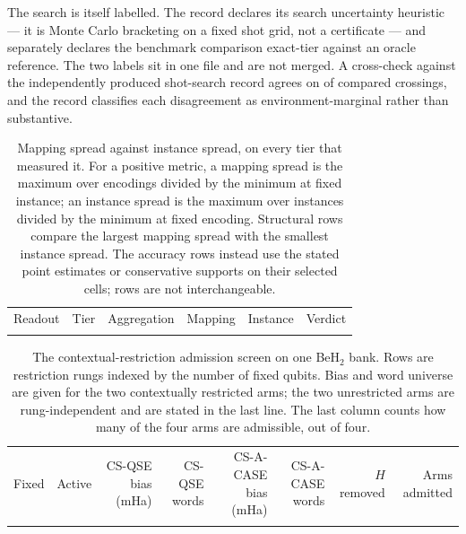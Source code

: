\documentclass[aps,pra,reprint,superscriptaddress,nofootinbib,floatfix,
  showkeys]{revtex4-2}
\begin{document}
The search is itself labelled.  The record declares its search uncertainty
heuristic --- it is Monte Carlo bracketing on a fixed shot grid, not a
certificate --- and separately declares the benchmark comparison exact-tier
against an oracle reference.  The two labels sit in one file and are not merged.
A cross-check against the independently produced shot-search record agrees on
\cqcCrossAgreeing{} of \cqcCrossChecked{} compared crossings, and the record
classifies each disagreement as environment-marginal rather than substantive.

\begin{table}
  \caption{Mapping spread against instance spread, on every tier that measured
  it. For a positive metric, a mapping spread is the maximum over encodings
  divided by the minimum at fixed instance; an instance spread is the maximum
  over instances divided by the minimum at fixed encoding. Structural rows
  compare the largest mapping spread with the smallest instance spread. The
  accuracy rows instead use the stated point estimates or conservative supports
  on their selected cells; rows are not interchangeable.}
  \label{tab:qr3}
  \footnotesize
  \begin{ruledtabular}
  \begin{tabular}{llp{}rrp{}}
  Readout & Tier & Aggregation & Mapping & Instance & Verdict \\
  \colrule
  
  \end{tabular}
  \end{ruledtabular}
\end{table}

\begin{table}
  \caption{The contextual-restriction admission screen on one BeH$_2$ bank.
  Rows are restriction rungs indexed by the number of fixed qubits.  Bias and
  word universe are given for the two contextually restricted arms; the two
  unrestricted arms are rung-independent and are stated in the last line.  The
  last column counts how many of the four arms are admissible, out of four.}
  \label{tab:r4a}
  \footnotesize
  \begin{ruledtabular}
  \begin{tabular}{rrrrrrrr}
  Fixed & Active & CS-QSE bias (mHa) & CS-QSE words & CS-A-CASE bias (mHa) & CS-A-CASE words & $H$ removed & Arms admitted \\
  \colrule
  
  \end{tabular}
  \end{ruledtabular}
\end{table}
\end{document}
